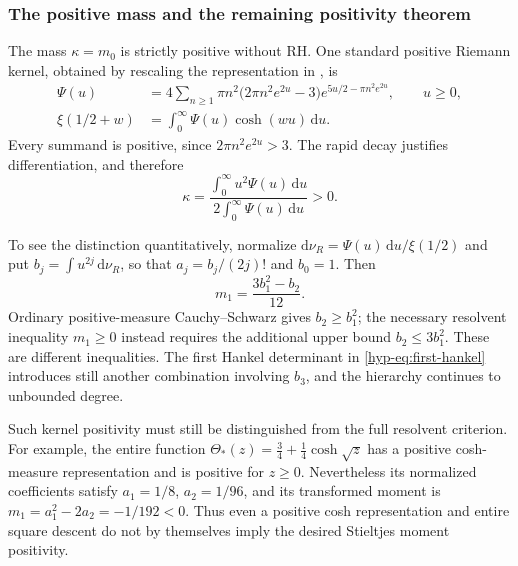 \documentclass[11pt,a4paper]{article}
\numberwithin{equation}{section}
\theoremstyle{definition}
\theoremstyle{remark}
\begin{document}
\subsubsection{The positive mass and the remaining positivity theorem}

The mass $\kappa=m_0$ is strictly positive without RH. One standard
positive Riemann kernel, obtained by rescaling the representation in
\cite[Section~4, Eqs.~(4.1)--(4.2)]{csordas-kernel}, is
\begin{align}
\Psi(u)&=4\sum_{n\geq1}\pi n^2
\bigl(2\pi n^2e^{2u}-3\bigr)
e^{5u/2-\pi n^2e^{2u}},\qquad u\geq0,
\label{hyp-eq:positive-riemann-kernel}\\
\xi(1/2+w)&=\int_0^\infty\Psi(u)\cosh(wu)\,\mathrm du.
\label{hyp-eq:riemann-cosh}
\end{align}
Every summand is positive, since $2\pi n^2e^{2u}>3$.
The rapid decay justifies differentiation, and therefore
\begin{equation}\label{hyp-eq:kappa-positive}
\kappa=\frac{\int_0^\infty u^2\Psi(u)\,\mathrm du}
{2\int_0^\infty\Psi(u)\,\mathrm du}>0.
\end{equation}

To see the distinction quantitatively, normalize
$\mathrm d\nu_R=\Psi(u)\,\mathrm du/\xi(1/2)$ and put
$b_j=\int u^{2j}\,\mathrm d\nu_R$, so that
$a_j=b_j/(2j)!$ and $b_0=1$. Then
\begin{equation}\label{hyp-eq:kurtosis-gap}
m_1=\frac{3b_1^2-b_2}{12}.
\end{equation}
Ordinary positive-measure Cauchy--Schwarz gives $b_2\geq b_1^2$;
the necessary resolvent inequality $m_1\geq0$ instead requires
the additional upper bound $b_2\leq3b_1^2$. These are different
inequalities. The first Hankel determinant in
\eqref{hyp-eq:first-hankel} introduces still another combination
involving $b_3$, and the hierarchy continues to unbounded degree.

Such kernel positivity must still be distinguished from the full
resolvent criterion. For example, the entire function
$\Theta_*(z)=\tfrac34+\tfrac14\cosh\sqrt z$ has a positive
cosh-measure representation and is positive for $z\geq0$.
Nevertheless its normalized coefficients satisfy
$a_1=1/8$, $a_2=1/96$, and its transformed moment is
$m_1=a_1^2-2a_2=-1/192<0$.
Thus even a positive cosh representation and entire square descent
do not by themselves imply the desired Stieltjes moment positivity.
\end{document}
